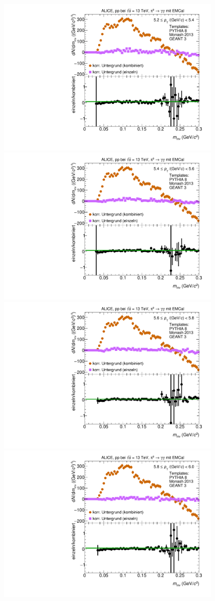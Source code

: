\begin{figure}[t]
\begin{multicols}{2}
\end{multicols}
\begin{multicols}{2}
    \includegraphics[width=.65\linewidth]{Anhang/BackgroundWithRatio20_Data_2016.pdf}\par
    \includegraphics[width=.65\linewidth]{Anhang/BackgroundWithRatio21_Data_2016.pdf}\par
\end{multicols}
\begin{multicols}{2}
    \includegraphics[width=.65\linewidth]{Anhang/BackgroundWithRatio22_Data_2016.pdf}\par
    \includegraphics[width=.65\linewidth]{Anhang/BackgroundWithRatio23_Data_2016.pdf}\par
\end{multicols}
\end{figure}
\clearpage

